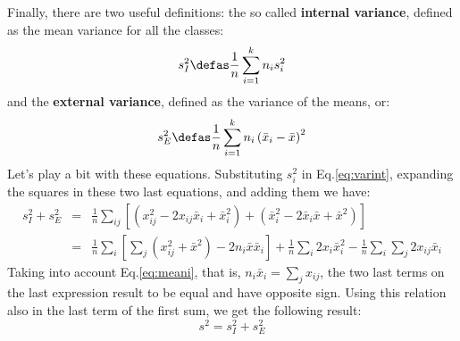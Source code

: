Finally, there are two useful definitions: the so called
\textbf{internal variance}, defined as the mean variance for all the
classes:
%
\begin{equation}
  \label{eq:varint}
  s_I^2 \defas \frac{1}{n} \sum_{i=1}^k n_i s_i^2
\end{equation}
%
and the \textbf{external variance}, defined as the variance of the
means, or:
%
\begin{equation}
  \label{eq:varext}
  s_E^2 \defas \frac{1}{n} \sum_{i=1}^k  n_i \left(\bar{x}_i-\bar{x}\right)^2
\end{equation}
%
Let's play a bit with these equations. Substituting $s_i^2$ in
Eq.\eqref{eq:varint}, expanding the squares in these two last
equations, and adding them we have:
%
\begin{eqnarray}
  \label{eq:proof1}
  s_I^2 + s_E^2 &=& \frac{1}{n} \sum_{ij} 
  \left[\left( x_{ij}^2 - 2 x_{ij} \bar{x}_i + \bar{x}_i^2 \right) +
    \left( \bar{x}_i^2 - 2 \bar{x}_i\bar{x} + \bar{x}^2 \right) \right] \\
  &=& \frac{1}{n} \sum_i \left[ \sum_j \left(x_{ij}^2+\bar{x}^2 \right) 
    - 2 n_i \bar{x} \bar{x}_i \right] +
  \frac{1}{n} \sum_i 2 x_i \bar{x}_i^2 - \frac{1}{n} \sum_i \sum_j 2 x_{ij} \bar{x}_i
\end{eqnarray}
%
Taking into account Eq.\eqref{eq:meani}, that is, $n_i \bar{x}_i = \sum_j
x_{ij}$, the two last terms on the last expression result to be equal
and have opposite sign. Using this relation also in the last term of
the first sum, we get the following result:
%
\begin{equation}
  \label{eq:variances}
  s^2 = s_I^2 + s_E^2
\end{equation}


\endinput
%

